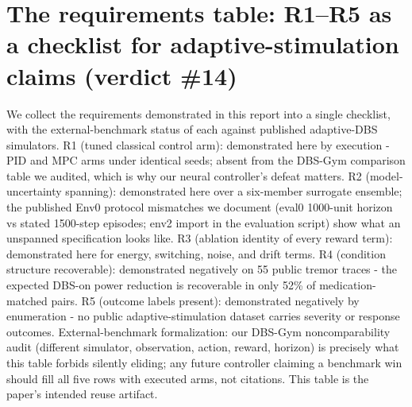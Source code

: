 \section{The requirements table: R1--R5 as a checklist for adaptive-stimulation claims (verdict \#14)}
We collect the requirements demonstrated in this report into a single checklist, with the external-benchmark status of each against published adaptive-DBS simulators. R1 (tuned classical control arm): demonstrated here by execution - PID and MPC arms under identical seeds; absent from the DBS-Gym comparison table we audited, which is why our neural controller's defeat matters. R2 (model-uncertainty spanning): demonstrated here over a six-member surrogate ensemble; the published Env0 protocol mismatches we document (eval0 1000-unit horizon vs stated 1500-step episodes; env2 import in the evaluation script) show what an unspanned specification looks like. R3 (ablation identity of every reward term): demonstrated here for energy, switching, noise, and drift terms. R4 (condition structure recoverable): demonstrated negatively on 55 public tremor traces - the expected DBS-on power reduction is recoverable in only 52\% of medication-matched pairs. R5 (outcome labels present): demonstrated negatively by enumeration - no public adaptive-stimulation dataset carries severity or response outcomes. External-benchmark formalization: our DBS-Gym noncomparability audit (different simulator, observation, action, reward, horizon) is precisely what this table forbids silently eliding; any future controller claiming a benchmark win should fill all five rows with executed arms, not citations. This table is the paper's intended reuse artifact.



